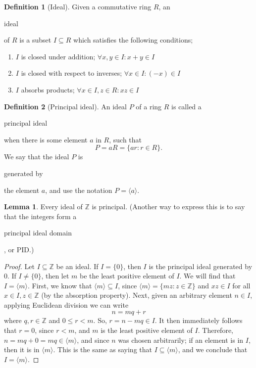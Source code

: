 \documentclass{article}
\theoremstyle{definition}
\theoremstyle{definition}
\newtheorem{definition}{Definition}
\newtheorem{lemma}{Lemma}
\newenvironment{enumerated}{ 
\begin{enumerate}
\setlength{\itemsep}{0pt}
\setlength{\parskip}{0pt}
\setlength{\parsep}{0pt}     
}{\end{enumerate}}
\begin{document}
\begin{definition}[Ideal]
  Given a commutative ring $R$, an \begin{em}ideal\end{em} of $R$ is a subset $I \subseteq R$ which satisfies the following conditions;
  \begin{enumerated}
    \item $I$ is closed under addition; $\forall x, y \in I : x + y \in I$
    \item $I$ is closed with respect to inverses; $\forall x \in I : (-x) \in I$
    \item $I$ absorbs products; $\forall x \in I, z \in R : xz \in I$
  \end{enumerated}
\end{definition}

\begin{definition}[Principal ideal] 
  An ideal $P$ of a ring $R$ is called a \begin{em}principal ideal\end{em} when there is some element $a$ in $R$, such that 
  $$P = aR = \{ar : r \in R\}.$$
  We say that the ideal $P$ is \begin{em}generated by\end{em} the element $a$, and use the notation $P = \langle a \rangle$.
\end{definition}

\begin{lemma}
\label{IdealsOfIntegers}
  Every ideal of $\mathbb{Z}$ is principal. (Another way to express this is to say that the integers form a \begin{em}principal ideal domain\end{em}, or PID.)
\end{lemma}
\begin{proof}
  Let $I \subseteq \mathbb{Z}$ be an ideal. If $I = \{0\}$, then $I$ is the principal ideal generated by $0$. If $I \ne \{0\}$, then let $m$ be the least positive element of $I$. We will find that $I = \langle m \rangle$. First, we know that $\langle m \rangle \subseteq I$, since $\langle m \rangle = \{mz : z \in \mathbb{Z}\}$ and $xz \in I$ for all $x \in I, z \in \mathbb{Z}$ (by the absorption property). Next, given an arbitrary element $n \in I$, applying Euclidean division we can write
  $$n = mq + r$$
  where $q, r \in \mathbb{Z}$ and $0 \le r < m$. So, $r = n - mq \in I$. It then immediately follows that $r = 0$, since $r < m$, and $m$ is the least positive element of $I$. Therefore, $n = mq + 0 = mq \in \langle m \rangle$, and since $n$ was chosen arbitrarily; if an element is in $I$, then it is in $\langle m \rangle$. This is the same as saying that $I \subseteq \langle m \rangle$, and we conclude that $I = \langle m \rangle$.
\end{proof}
\end{document}
